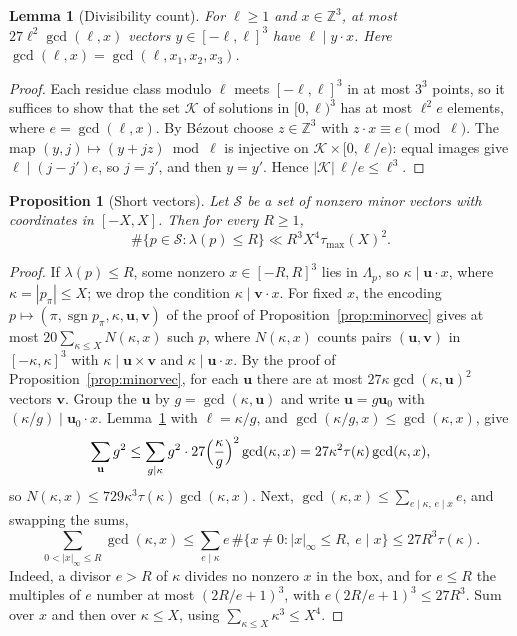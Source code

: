 \documentclass[11pt]{article}
\newtheorem{lemma}[theorem]{Lemma}
\newtheorem{proposition}[theorem]{Proposition}
\theoremstyle{definition}
\theoremstyle{remark}
\begin{document}
\begin{lemma}[Divisibility count]\label{lem:dotcount}
For $\ell\ge1$ and $x\in\mathbb Z^3$, at most $27\ell^2\gcd(\ell,x)$ vectors
$y\in[-\ell,\ell]^3$ have $\ell\mid y\cdot x$. Here $\gcd(\ell,x)=\gcd(\ell,x_1,x_2,x_3)$.
\end{lemma}

\begin{proof}
Each residue class modulo $\ell$ meets $[-\ell,\ell]^3$ in at most $3^3$ points, so it suffices
to show that the set $\mathcal K$ of solutions in $[0,\ell)^3$ has at most $\ell^2e$ elements, where
$e=\gcd(\ell,x)$. By B\'ezout choose $z\in\mathbb Z^3$ with $z\cdot x\equiv e\pmod\ell$. The map
$(y,j)\mapsto(y+jz)\bmod\ell$ is injective on $\mathcal K\times[0,\ell/e)$: equal images give
$\ell\mid(j-j')e$, so $j=j'$, and then $y=y'$. Hence $|\mathcal K|\,\ell/e\le\ell^3$.
\end{proof}

\begin{proposition}[Short vectors]\label{prop:short}
Let $\mathcal S$ be a set of nonzero minor vectors with coordinates in $[-X,X]$.
Then for every $R\ge1$,
\[
\#\{p\in\mathcal S:\lambda(p)\le R\}\ll R^3X^4\tau_{\max}(X)^2 .
\]
\end{proposition}

\begin{proof}
If $\lambda(p)\le R$, some nonzero $x\in[-R,R]^3$ lies in $\Lambda_p$, so
$\kappa\mid \mathbf u\cdot x$, where $\kappa=|p_\pi|\le X$; we drop the condition $\kappa\mid \mathbf v\cdot x$. For fixed $x$, the encoding $p\mapsto(\pi,\operatorname{sgn}p_\pi,\kappa,\mathbf u,\mathbf v)$
of the proof of Proposition~\ref{prop:minorvec} gives at most $20\sum_{\kappa\le X}N(\kappa,x)$
such $p$, where $N(\kappa,x)$ counts pairs $(\mathbf u,\mathbf v)$ in $[-\kappa,\kappa]^3$ with
$\kappa\mid \mathbf u\times \mathbf v$ and $\kappa\mid \mathbf u\cdot x$. By the proof of
Proposition~\ref{prop:minorvec}, for each $\mathbf u$ there are at most $27\kappa\gcd(\kappa,\mathbf u)^2$
vectors $\mathbf v$. Group the $\mathbf u$ by $g=\gcd(\kappa,\mathbf u)$ and write $\mathbf u=g\mathbf u_0$ with $(\kappa/g)\mid \mathbf u_0\cdot x$.
Lemma~\ref{lem:dotcount} with $\ell=\kappa/g$, and $\gcd(\kappa/g,x)\le\gcd(\kappa,x)$, give
\[
 \sum_{\mathbf u}g^2\le\sum_{g\mid\kappa}g^2\cdot27\Bigl(\frac\kappa g\Bigr)^2\gcd(\kappa,x)
 =27\kappa^2\tau(\kappa)\gcd(\kappa,x),
\]
so $N(\kappa,x)\le729\kappa^3\tau(\kappa)\gcd(\kappa,x)$. Next,
$\gcd(\kappa,x)\le\sum_{e\mid\kappa,\,e\mid x}e$, and
swapping the sums,
\[
 \sum_{0<|x|_\infty\le R}\gcd(\kappa,x)
 \le\sum_{e\mid\kappa}e\,\#\{x\ne0:|x|_\infty\le R,\ e\mid x\}
 \le27R^3\tau(\kappa).
\]
Indeed, a divisor $e>R$ of $\kappa$ divides no nonzero $x$ in the box, and for $e\le R$
the multiples of $e$ number at most $(2R/e+1)^3$, with
$e(2R/e+1)^3\le27R^3$. Sum over $x$ and then over $\kappa\le X$,
using $\sum_{\kappa\le X}\kappa^3\le X^4$.
\end{proof}
\end{document}
